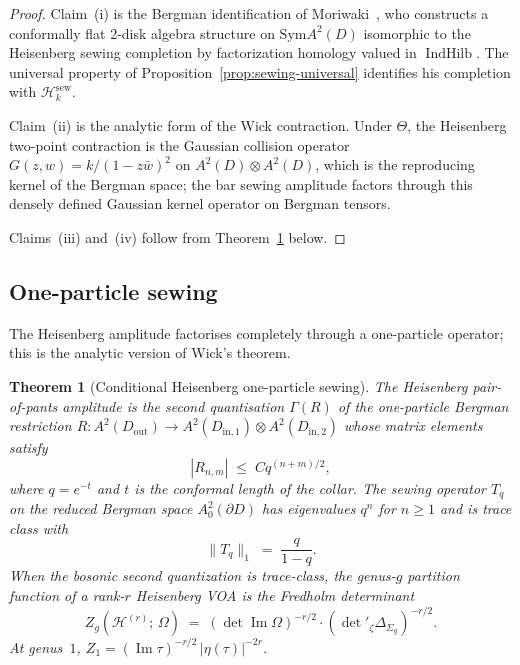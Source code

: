 \documentclass[11pt,reqno]{amsart}
\newtheorem{theorem}{Theorem}[section]
\theoremstyle{definition}
\theoremstyle{remark}
\newcommand{\cH}{\mathcal{H}}
\newcommand{\Sym}{\mathrm{Sym}}
\numberwithin{equation}{section}
\begin{document}
\begin{proof}
Claim~(i) is the Bergman identification of
Moriwaki~\cite{Moriwaki26b}, who constructs a conformally flat
2-disk algebra structure on $\Sym A^2(D)$ isomorphic to the
Heisenberg sewing completion by factorization homology valued
in $\operatorname{IndHilb}$. The universal property of
Proposition~\ref{prop:sewing-universal} identifies his
completion with $\cH_k^{\mathrm{sew}}$.

Claim~(ii) is the analytic form of the Wick contraction. Under
$\Theta$, the Heisenberg two-point contraction is the Gaussian collision
operator
$G(z, w) = k/(1 - z\bar w)^2$ on $A^2(D) \otimes A^2(D)$,
which is the reproducing kernel of the Bergman space; the bar
sewing amplitude factors through this densely defined Gaussian kernel
operator on Bergman tensors.

Claims~(iii) and~(iv) follow from
Theorem~\ref{thm:heisenberg-one-particle} below.
\end{proof}

\subsection{One-particle sewing}

The Heisenberg amplitude factorises completely through a
one-particle operator; this is the analytic version of Wick's
theorem.

\begin{theorem}[Conditional Heisenberg one-particle sewing]
\label{thm:heisenberg-one-particle}
The Heisenberg pair-of-pants amplitude is the second quantisation
$\Gamma(R)$ of the one-particle Bergman restriction
$R \colon A^2(D_{\mathrm{out}}) \to
A^2(D_{\mathrm{in},1}) \otimes A^2(D_{\mathrm{in},2})$
whose matrix elements satisfy
\[
|R_{n,m}| \;\leq\; C q^{(n+m)/2},
\]
where $q = e^{-t}$ and $t$ is the conformal length of the collar.
The sewing operator $T_q$ on the reduced Bergman space
$A^2_0(\partial D)$ has eigenvalues $q^n$ for $n \geq 1$ and is
trace class with
\[
\|T_q\|_1 \;=\; \frac{q}{1 - q}.
\]
When the bosonic second quantization is trace-class, the genus-$g$
partition function of a rank-$r$ Heisenberg VOA is the Fredholm
determinant
\begin{equation}\label{eq:heisenberg-fredholm}
Z_g(\cH^{(r)};\,\Omega)
\;=\;
(\det\operatorname{Im}\Omega)^{-r/2}
\cdot (\det{}'_\zeta \Delta_{\Sigma_g})^{-r/2}.
\end{equation}
At genus~$1$,
$Z_1 = (\operatorname{Im}\tau)^{-r/2}\,|\eta(\tau)|^{-2r}$.
\end{theorem}
\end{document}
